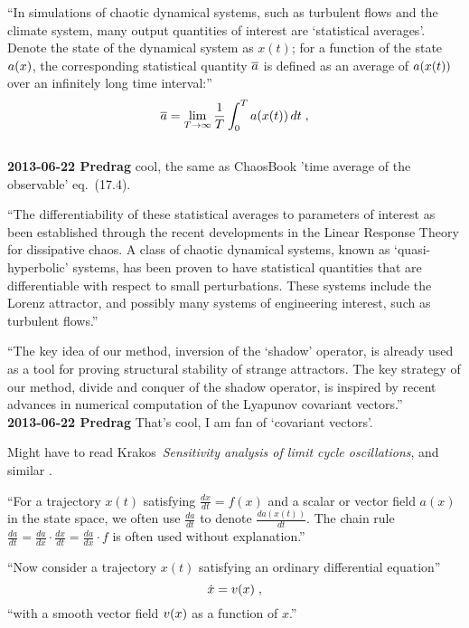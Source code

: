 \begin{description}
``In simulations of chaotic dynamical systems, such as turbulent flows and
the climate system, many output quantities of interest are
                                \toCB
`statistical
averages'.  Denote the state of the dynamical system as $x(t)$;
for a function of the state $a(x)$,
the corresponding statistical quantity $\overline{a}$ is defined
as an average of $a(x(t))$ over an infinitely long time interval:''
\begin{equation} \label{Wang13:stats}
\overline{a} = \lim_{T\rightarrow\infty}
\frac1T \int_0^T a(x(t))\,dt\;,
\end{equation}
\\
{\bf 2013-06-22 Predrag} cool, the same as ChaosBook 'time average of
the observable' eq.~(17.4).

``The differentiability of these statistical averages to parameters
of interest as been established through the recent developments in
the Linear Response Theory for dissipative
chaos. A class of chaotic dynamical systems,
known as `quasi-hyperbolic' systems, has been proven to have
statistical quantities that are differentiable with respect to small
perturbations.  These systems include the Lorenz attractor, and
possibly many systems of engineering interest, such as turbulent
flows.''

``The key idea of our method, inversion of the `shadow' operator, is
already used as a tool for proving structural stability of strange
attractors. The key strategy of our method, divide and
conquer of the shadow operator, is inspired by recent advances in
numerical computation of the Lyapunov covariant
vectors.''
\\
{\bf 2013-06-22 Predrag} That's cool, I am fan of `covariant vectors'.

Might have to read Krakos\etal\
\emph{Sensitivity analysis of limit cycle oscillations},
and similar .

                                    \toCB
``For a trajectory $x(t)$ satisfying $\frac{dx}{dt} = f(x)$ and a
scalar or vector field $a(x)$ in the state space, we often use
$\frac{da}{dt}$ to denote $\frac{da(x(t))}{dt}$.  The chain rule
$\frac{da}{dt} = \frac{da}{dx}\cdot \frac{dx}{dt} =
\frac{da}{dx}\cdot f$ is often used without explanation.''

``Now consider a trajectory $x(t)$ satisfying an ordinary differential
equation''
\begin{equation}\label{Wang13:ode}
\dot{x} = v(x) \;,
\end{equation}
``with a smooth vector field $v(x)$ as a function of $x$.''


\end{description}
